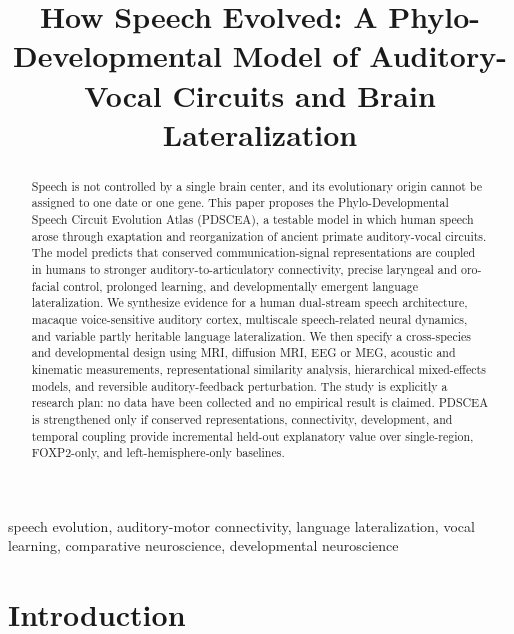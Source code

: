 \documentclass[conference]{IEEEtran}
\begin{document}
\title{How Speech Evolved: A Phylo-Developmental Model of Auditory-Vocal Circuits and Brain Lateralization}

\author{
}

\maketitle

\begin{abstract}
Speech is not controlled by a single brain center, and its evolutionary origin cannot be assigned to one date or one gene. This paper proposes the Phylo-Developmental Speech Circuit Evolution Atlas (PDSCEA), a testable model in which human speech arose through exaptation and reorganization of ancient primate auditory-vocal circuits. The model predicts that conserved communication-signal representations are coupled in humans to stronger auditory-to-articulatory connectivity, precise laryngeal and oro-facial control, prolonged learning, and developmentally emergent language lateralization. We synthesize evidence for a human dual-stream speech architecture, macaque voice-sensitive auditory cortex, multiscale speech-related neural dynamics, and variable partly heritable language lateralization. We then specify a cross-species and developmental design using MRI, diffusion MRI, EEG or MEG, acoustic and kinematic measurements, representational similarity analysis, hierarchical mixed-effects models, and reversible auditory-feedback perturbation. The study is explicitly a research plan: no data have been collected and no empirical result is claimed. PDSCEA is strengthened only if conserved representations, connectivity, development, and temporal coupling provide incremental held-out explanatory value over single-region, FOXP2-only, and left-hemisphere-only baselines.
\end{abstract}

\begin{IEEEkeywords}
speech evolution, auditory-motor connectivity, language lateralization, vocal learning, comparative neuroscience, developmental neuroscience
\end{IEEEkeywords}

\section{Introduction}
\end{document}
